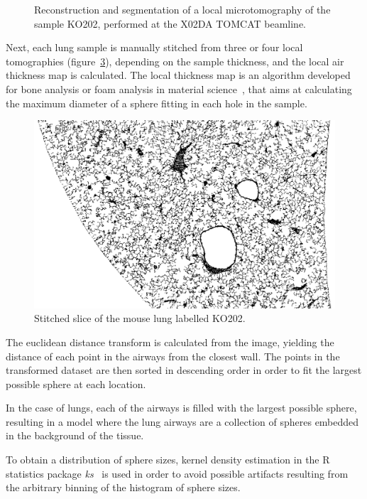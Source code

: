 \begin{figure}[htb]
\begin{subfigure}[b]{.49\textwidth}
    \caption{}
    \label{fig:segmented}
    \end{subfigure}
    \caption[Reconstruction of a lung microtomography.]{Reconstruction and
        segmentation of a local microtomography of the sample KO202,
        performed at the X02DA TOMCAT beamline.}
\end{figure}

Next, each lung sample is manually stitched from three or four local
tomographies (figure~\ref{fig:stitched}), depending on the sample thickness, and the local air thickness
map is calculated. The local thickness map is an algorithm developed for
bone analysis or foam analysis in material science~\cite{6778077}, that aims
at calculating the maximum diameter of a sphere fitting in each hole in the
sample.

\begin{figure}[htb]
    \centering
    \includegraphics[width=\textwidth]{gfx/lung-paper-figures/0700.png}
    \caption{Stitched slice of the mouse lung labelled KO202.}
    \label{fig:stitched}
\end{figure}

The euclidean distance transform is calculated from the image, yielding the
distance of each point in the airways from the closest wall. The points in
the transformed dataset are then sorted in descending order in order to fit
the largest possible sphere at each location.

In the case of lungs, each of the airways is filled with the largest possible
sphere, resulting in a model where the lung airways are a collection of
spheres embedded in the background of the tissue.

To obtain a distribution of sphere sizes, kernel density estimation in the R
statistics package \emph{ks}~\cite{JSSv021i07} is used in order to avoid possible artifacts
resulting from the arbitrary binning of the histogram of sphere sizes.

